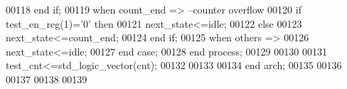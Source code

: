 \begin{DoxyCode}
00118             \textcolor{keywordflow}{end} \textcolor{keywordflow}{if};
00119         \textcolor{keywordflow}{when} \textcolor{vhdlchar}{count\_end} \textcolor{vhdlchar}{=}\textcolor{vhdlchar}{>}\textcolor{keyword}{           --counter overflow}
00120             \textcolor{keywordflow}{if} \textcolor{vhdlchar}{test_en_reg}\textcolor{vhdlchar}{(}\textcolor{vhdllogic}{}\textcolor{vhdllogic}{1}\textcolor{vhdlchar}{)}\textcolor{vhdlchar}{=}\textcolor{vhdlchar}{'}\textcolor{vhdllogic}{}\textcolor{vhdllogic}{0}\textcolor{vhdlchar}{'} \textcolor{keywordflow}{then} 
00121                 \textcolor{vhdlchar}{next_state}\textcolor{vhdlchar}{<=}\textcolor{vhdlchar}{idle};
00122             \textcolor{keywordflow}{else} 
00123                 \textcolor{vhdlchar}{next_state}\textcolor{vhdlchar}{<=}\textcolor{vhdlchar}{count\_end};
00124             \textcolor{keywordflow}{end} \textcolor{keywordflow}{if};             
00125         \textcolor{keywordflow}{when} \textcolor{keywordflow}{others} \textcolor{vhdlchar}{=}\textcolor{vhdlchar}{>} 
00126             \textcolor{vhdlchar}{next_state}\textcolor{vhdlchar}{<=}\textcolor{vhdlchar}{idle};
00127     \textcolor{keywordflow}{end} \textcolor{keywordflow}{case};
00128 \textcolor{keywordflow}{end} \textcolor{keywordflow}{process};
00129 
00130 
00131 \textcolor{vhdlchar}{test_cnt}\textcolor{vhdlchar}{<=}\textcolor{comment}{std\_logic\_vector}\textcolor{vhdlchar}{(}\textcolor{vhdlchar}{cnt}\textcolor{vhdlchar}{)};
00132      
00133   
00134 \textcolor{keywordflow}{end} \textcolor{vhdlchar}{arch};
00135 
00136 
00137 
00138 
00139 
\end{DoxyCode}
